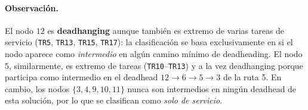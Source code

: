 \documentclass[12pt, a4paper]{article}
\begin{document}
\paragraph{Observación.}
El nodo $12$ es \textbf{deadhanging} aunque también es extremo
de varias tareas de servicio (\texttt{TR5}, \texttt{TR13},
\texttt{TR15}, \texttt{TR17}): la clasificación se basa exclusivamente
en si el nodo aparece como \emph{intermedio} en algún camino mínimo
de deadheading. El nodo $5$, similarmente, es extremo de tareas
(\texttt{TR10}--\texttt{TR13}) y a la vez deadhanging porque
participa como intermedio en el deadhead $12 \to 6 \to 5 \to 3$
de la ruta 5. En cambio, los nodos $\{3,4,9,10,11\}$ nunca son
intermedios en ningún deadhead de esta solución, por lo que se
clasifican como \emph{solo de servicio}.
\end{document}
